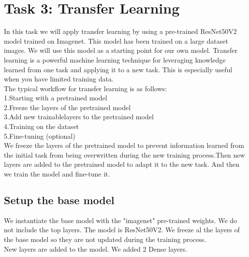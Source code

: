\documentclass[conference]{IEEEtran}
\begin{document}
\section{Task 3: Transfer Learning} \label{sec:task_3}
In this task we will apply transfer learning by using a pre-trained ResNet50V2 model trained on Imagenet. This model has been trained on a large dataset images. We will use this model as a starting point for our own model. Transfer learning is a powerful machine learning technique for leveraging knowledge learned
from one task and applying it to a new task. This is especially useful when you have limited training data. \\

The typical workflow for transfer learning is as follows: \\
1.Starting with a pretrained model\\
2.Freeze the layers of the pretrained model\\
3.Add new trainablelayers to the pretrained model\\
4.Training on the dataset\\
5.Fine-tuning (optional)\\

We freeze the layers of the pretrained model to prevent information learned from the initial task from being overwritten during the new training process.Then new layers are added to the pretrained model to adapt it to the new task. And then we train the model and fine-tune it.\\

\subsection{Setup the base model}
We instantiate the base model with the "imagenet" pre-trained weights. We do not include the top layers. The model is ResNet50V2. We freeze al the layers of the base model so they are not updated during the training process.\\

New layers are added to the model. We added 2 Dense layers.\\
\end{document}
